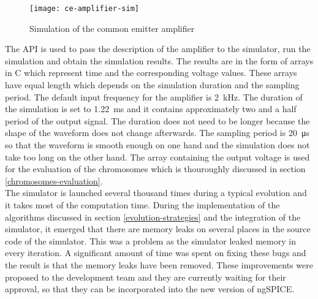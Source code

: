 \begin{figure}[H]
    \centering
    \texttt{[image: ce-amplifier-sim]}\label{ce-amplifier-sim}
    \caption{Simulation of the common emitter amplifier}
\end{figure}

The API is used to pass the description of the amplifier to the simulator, run the simulation and obtain the simulation results. The results are in the form of arrays in C which represent time and the corresponding voltage values. These arrays have equal length which depends on the simulation duration and the sampling period. The default input frequency for the amplifier is \SI{2}{\kilo\hertz}. The duration of the simulation is set to \SI{1.22}{\milli\second} and it contains approximately two and a half period of the output signal. The duration does not need to be longer because the shape of the waveform does not change afterwards. The sampling period is \SI{20}{\micro\second} so that the waveform is smooth enough on one hand and the simulation does not take too long on the other hand. The array containing the output voltage is used for the evaluation of the chromosomes which is thouroughly discussed in section \ref{chromosomes-evaluation}.\\
The simulator is launched several thousand times during a typical evolution and it takes most of the computation time. During the implementation of the algorithms discussed in section \ref{evolution-strategies} and the integration of the simulator, it emerged that there are memory leaks on several places in the source code of the simulator. This was a problem as the simulator leaked memory in every iteration. A significant amount of time was spent on fixing these bugs and the result is that the memory leaks have been removed. These improvements were proposed to the development team and they are currently waiting for their approval, so that they can be incorporated into the new version of ngSPICE.